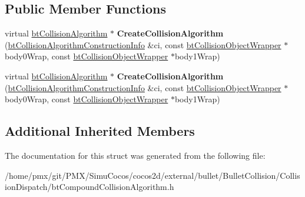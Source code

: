 \subsection*{Public Member Functions}
\begin{DoxyCompactItemize}
\item 
\mbox{\label{structbtCompoundCollisionAlgorithm_1_1SwappedCreateFunc_a65e9d68446429525bf4171a79f556b33}} 
virtual \hyperlink{classbtCollisionAlgorithm}{bt\+Collision\+Algorithm} $\ast$ {\bfseries Create\+Collision\+Algorithm} (\hyperlink{structbtCollisionAlgorithmConstructionInfo}{bt\+Collision\+Algorithm\+Construction\+Info} \&ci, const \hyperlink{structbtCollisionObjectWrapper}{bt\+Collision\+Object\+Wrapper} $\ast$body0\+Wrap, const \hyperlink{structbtCollisionObjectWrapper}{bt\+Collision\+Object\+Wrapper} $\ast$body1\+Wrap)
\item 
\mbox{\label{structbtCompoundCollisionAlgorithm_1_1SwappedCreateFunc_a65e9d68446429525bf4171a79f556b33}} 
virtual \hyperlink{classbtCollisionAlgorithm}{bt\+Collision\+Algorithm} $\ast$ {\bfseries Create\+Collision\+Algorithm} (\hyperlink{structbtCollisionAlgorithmConstructionInfo}{bt\+Collision\+Algorithm\+Construction\+Info} \&ci, const \hyperlink{structbtCollisionObjectWrapper}{bt\+Collision\+Object\+Wrapper} $\ast$body0\+Wrap, const \hyperlink{structbtCollisionObjectWrapper}{bt\+Collision\+Object\+Wrapper} $\ast$body1\+Wrap)
\end{DoxyCompactItemize}
\subsection*{Additional Inherited Members}


The documentation for this struct was generated from the following file\+:\begin{DoxyCompactItemize}
\item 
/home/pmx/git/\+P\+M\+X/\+Simu\+Cocos/cocos2d/external/bullet/\+Bullet\+Collision/\+Collision\+Dispatch/bt\+Compound\+Collision\+Algorithm.\+h\end{DoxyCompactItemize}
